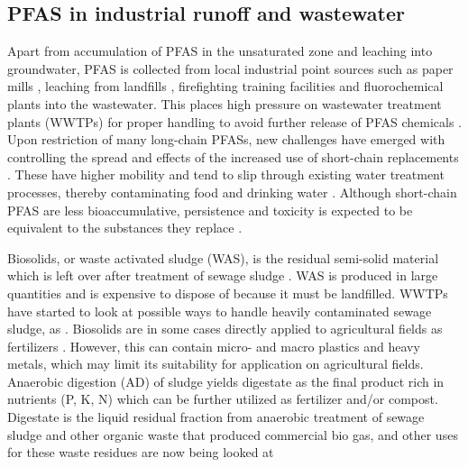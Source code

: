 \subsection{PFAS in industrial runoff and wastewater}
Apart from accumulation of PFAS in the unsaturated zone and leaching into groundwater, PFAS is collected from local industrial point sources such as paper mills \citep{lee2020legacy,langberg2021paper}, leaching from landfills \citep{masoner2020landfill}, firefighting training facilities \citep{MD2016workshop} and fluorochemical plants \citep{gebbink2017presence} into the wastewater. This places high pressure on wastewater treatment plants (WWTPs) for proper handling to avoid further release of PFAS chemicals  \citep{Morin2017flameWaste}. Upon restriction of many long-chain PFASs, new challenges have emerged with controlling the spread and effects of the increased use of short-chain replacements \citep{knutsen2019leachate}. These have higher mobility and tend to slip through existing water treatment processes, thereby contaminating food and drinking water \citep{hale2020persistent,brendel2018short}. Although short-chain PFAS are less bioaccumulative, persistence and toxicity is expected to be equivalent to the substances they replace \citep{EC2020PFAS}. 

Biosolids, or waste activated sludge (WAS), is the residual semi-solid material which is left over after treatment of sewage sludge \citep{Raheem2018}. WAS is produced in large quantities and is expensive to dispose of because it must be landfilled. WWTPs have started to look at possible ways to handle heavily contaminated sewage sludge, as \citep{Raheem2018}. Biosolids are in some cases directly applied to agricultural fields as fertilizers \citep{moodie2021legacy}. However, this can contain micro- and macro plastics and heavy metals, which may limit its suitability for application on agricultural fields. Anaerobic digestion (AD) of sludge yields digestate as the final product rich in nutrients (P, K, N) which can be further utilized as fertilizer and/or compost. Digestate is the liquid residual fraction from anaerobic treatment of sewage sludge and other organic waste that produced commercial bio gas, and other uses for these waste residues are now being looked at  


